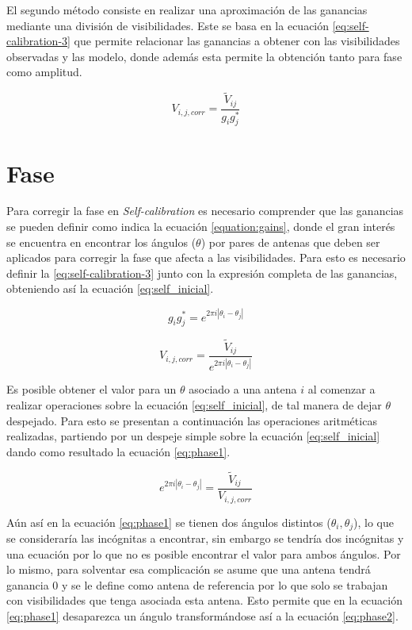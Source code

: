 El segundo método consiste en realizar una aproximación de las ganancias mediante una división de visibilidades. Este se basa en la ecuación \ref{eq:self-calibration-3} que permite relacionar las ganancias a obtener con las visibilidades observadas y las modelo, donde además esta permite la obtención tanto para fase como amplitud.

\begin{equation}
    V_{i,j,corr} = \frac{\tilde{V}_{ij}}{g_{i}g_{j}^{*}}
    \label{eq:self-calibration-3}
\end{equation}

\section{Fase}

Para corregir la fase en \textit{Self-calibration} es necesario comprender que las ganancias se pueden definir como indica la ecuación \ref{equation:gains}, donde el gran interés se encuentra en encontrar los ángulos ($\theta$) por pares de antenas que deben ser aplicados para corregir la fase que afecta a las visibilidades. Para esto es necesario definir la \ref{eq:self-calibration-3} junto con la expresión completa de las ganancias, obteniendo así la ecuación \ref{eq:self_inicial}. 

\begin{equation}
    g_{i}g_{j}^{*} = e^{2\pi i|\theta_{i} - \theta_{j}|}
    \label{equation:gains}
\end{equation}

\begin{equation}
    V_{i,j,corr} = \frac{\tilde{V}_{ij}}{e^{2\pi i|\theta_{i} - \theta_{j}|}}
    \label{eq:self_inicial}
\end{equation}

Es posible obtener el valor para un $\theta$ asociado a una antena $i$ al comenzar a realizar operaciones sobre la ecuación \ref{eq:self_inicial}, de tal manera de dejar $\theta$ despejado. Para esto se presentan a continuación las operaciones aritméticas realizadas, partiendo por un despeje simple sobre la ecuación \ref{eq:self_inicial} dando como resultado la ecuación \ref{eq:phase1}. 

\begin{equation}
    e^{2\pi i|\theta_{i} - \theta_{j}|}= \frac{\tilde{V}_{ij}}{V_{i,j,corr}}
    \label{eq:phase1}
\end{equation}

Aún así en la ecuación \ref{eq:phase1} se tienen dos ángulos distintos ($\theta_{i}, \theta_{j}$), lo que se consideraría las incógnitas a encontrar, sin embargo se tendría dos incógnitas y una ecuación por lo que no es posible encontrar el valor para ambos ángulos. Por lo mismo, para solventar esa complicación se asume que una antena tendrá ganancia 0 y se le define como antena de referencia por lo que solo se trabajan con visibilidades que tenga asociada esta antena. Esto permite que en la ecuación \ref{eq:phase1} desaparezca un ángulo transformándose así a la ecuación \ref{eq:phase2}.

